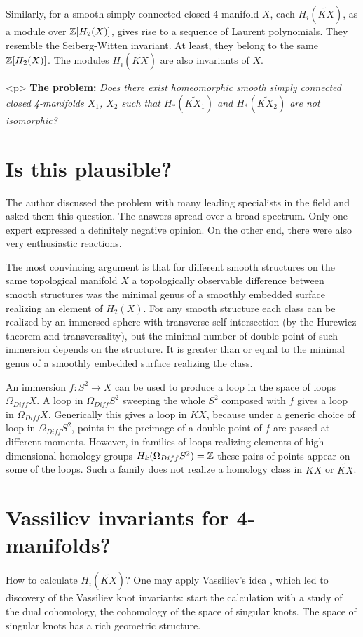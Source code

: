 \documentclass{article}
\def\<{\textless}
\def\>{\textgreater}
\begin{document}
Similarly, for a smooth simply connected closed 4-manifold $X$, each
$H_i(\widetilde{KX})$, as a module over $\mathbb Z[H_2(X)]$, gives rise to 
a sequence of Laurent polynomials. They resemble the Seiberg-Witten 
invariant. At least, they belong to the same $\mathbb Z[H_2(X)]$.
The modules $H_i(\widetilde{KX})$ are also invariants of $X$.\medskip


\<p\>
{\bf The problem:} {\em Does there exist homeomorphic smooth simply 
connected closed 4-manifolds $X_1$, $X_2$ such that  $H_*(\widetilde{KX_1})$
and  $H_*(\widetilde{KX_2})$ are not isomorphic?\/}

\section{Is this plausible?}\label{s7}
The author discussed the problem with many leading specialists in the field 
and asked them this question. The answers spread over a broad spectrum. Only 
one expert expressed a definitely negative opinion. 
On the other end, there were also very enthusiastic reactions. 

The most convincing argument is that for different smooth structures on the
same topological manifold $X$ a topologically observable difference between
smooth structures was the minimal genus of a smoothly embedded surface 
realizing  an element of $H_2(X)$. For any smooth structure each class can be 
realized
by an immersed sphere with transverse self-intersection (by the Hurewicz 
theorem and transversality), but the minimal number of
double point of such immersion depends on the structure. It is greater than 
or equal to the minimal genus of a smoothly embedded surface realizing the
class.  

An immersion $f:S^2\to X$ can be used to produce a loop in the space of
loops $\Omega_{Diff} X$. A loop in $\Omega_{Diff}S^2$ sweeping the whole $S^2$
composed with $f$ gives a loop in $\Omega_{Diff} X$. Generically this gives a 
loop
in $KX$, because under a generic choice of loop in $\Omega_{Diff} S^2$, points 
in 
the preimage of a double point of $f$ are passed at different moments. 
However, in families of loops realizing elements of high-dimensional 
homology groups $H_k(\Omega_{Diff} S^2)=\mathbb Z$ these pairs of points appear on some
of the loops. Such a family does not realize a homology class in $KX$ or
$\widetilde{KX}$.    


\section{Vassiliev invariants for 4-manifolds?}\label{s8}
How to calculate $H_i(\widetilde{KX})$? One may apply Vassiliev's idea
\cite{Va}, which 
led to discovery of the Vassiliev knot invariants: start the calculation 
with a study of the dual cohomology, the cohomology of the space of singular
knots. The space of singular knots has a rich geometric structure. 
\end{document}
